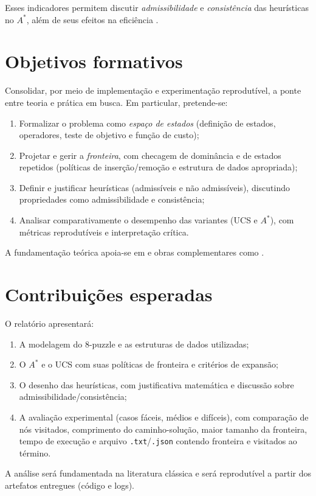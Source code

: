 Esses indicadores permitem discutir \emph{admissibilidade} e \emph{consistência} das heurísticas no $A^*$, além de seus efeitos na eficiência \cite{russell2010artificial,luger2009artificial}.  
  
\vspace{0.5cm}  
\section{Objetivos formativos}  
  
Consolidar, por meio de implementação e experimentação reprodutível, a ponte entre teoria e prática em busca. Em particular, pretende-se:  
\begin{enumerate}[label=(\alph*),leftmargin=*,itemsep=0pt,topsep=2pt]  
  \item Formalizar o problema como \emph{espaço de estados} (definição de estados, operadores, teste de objetivo e função de custo);  
  \item Projetar e gerir a \emph{fronteira}, com checagem de dominância e de estados repetidos (políticas de inserção/remoção e estrutura de dados apropriada);  
  \item Definir e justificar heurísticas (admissíveis e não admissíveis), discutindo propriedades como admissibilidade e consistência;  
  \item Analisar comparativamente o desempenho das variantes (UCS e $A^*$), com métricas reprodutíveis e interpretação crítica.  
\end{enumerate}  
A fundamentação teórica apoia-se em  e obras complementares como .  
  
\vspace{0.5cm}  
\section{Contribuições esperadas}  
  
O relatório apresentará:  
\begin{enumerate}[label=(\roman*),leftmargin=*,itemsep=0pt,topsep=2pt]  
  \item A modelagem do 8-puzzle e as estruturas de dados utilizadas;  
  \item O $A^*$ e o UCS com suas políticas de fronteira e critérios de expansão;  
  \item O desenho das heurísticas, com justificativa matemática e discussão sobre admissibilidade/consistência;  
  \item A avaliação experimental (casos fáceis, médios e difíceis), com comparação de nós visitados, comprimento do caminho-solução, maior tamanho da fronteira, tempo de execução e arquivo \texttt{.txt}/\texttt{.json} contendo fronteira e visitados ao término.  
\end{enumerate}  
A análise será fundamentada na literatura clássica \cite{russell2010artificial,luger2009artificial,nilsson1998,ertel2017} e será reprodutível a partir dos artefatos entregues (código e logs).  